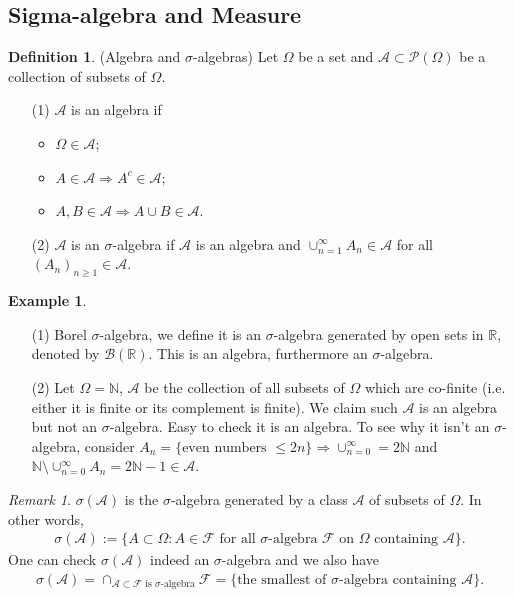\documentclass[a4paper,11pt]{report}
\theoremstyle{plain} %
\theoremstyle{definition} %
\newtheorem{defn}[thm]{Definition}
\newtheorem{eg}[thm]{Example}
\theoremstyle{remark} %
\newtheorem*{rem}{Remark}
\begin{document}
\subsection{Sigma-algebra and Measure}
\begin{defn}(Algebra and $\sigma$-algebras) Let $\Omega$ be a set and $\mathcal{A}\subset \mathcal{P}(\Omega)$ be a collection of subsets of $\Omega$. 
\begin{itemize}
    \item[(1)] $\mathcal{A}$ is an algebra if 
            \begin{itemize}
            \item     $\Omega \in \mathcal{A}$;  
            \item    $A\in \mathcal{A} \Rightarrow A^c \in \mathcal{A}$; 
            \item  $A,B \in \mathcal{A} \Rightarrow A \cup B \in \mathcal{A}$.
            \end{itemize}

    \item[(2)] $\mathcal{A}$ is an $\sigma$-algebra if $\mathcal{A}$ is an algebra and $\cup_{n=1}^{\infty} A_{n} \in \mathcal{A}$ for all $(A_{n})_{n\geq 1} \in \mathcal{A}$.
\end{itemize}

\end{defn}

\begin{eg}
\begin{itemize}
    \item[(1)] Borel $\sigma$-algebra, we define it is an $\sigma$-algebra generated by open sets in $\mathbb{R}$, denoted by $\mathcal{B}(\mathbb{R})$. This is an algebra, furthermore an $\sigma$-algebra.
    \item[(2)] Let $\Omega = \mathbb{N}$, $\mathcal{A}$ be the collection of all subsets of $\Omega$ which are co-finite (i.e. either it is finite or its complement is finite). We claim such $\mathcal{A}$ is an algebra but not an $\sigma$-algebra. Easy to check it is an algebra. To see why it isn't an $\sigma$-algebra, consider $A_{n}=\{\text{even numbers $\leq 2n$} \}\Rightarrow \cup_{n=0}^{\infty} = 2\mathbb{N} $ and $\mathbb{N}\setminus \cup_{n=0}^{\infty} A_{n}=2\mathbb{N}-1 \in \mathcal{A}$. 
\end{itemize}
\end{eg}

\begin{rem}$\sigma (\mathcal{A})$ is the $\sigma$-algebra generated by a class $\mathcal{A}$ of subsets of $\Omega$. In other words, 
\begin{align*}
    \sigma (\mathcal{A}):=\{A\subset \Omega: A\in \mathcal{F} \text{ for all $\sigma$-algebra $\mathcal{F}$ on $\Omega$ containing $\mathcal{A}$} \}.
\end{align*}
One can check $\sigma (\mathcal{A})$ indeed an $\sigma$-algebra and we also have 
\begin{align*}
    \sigma (\mathcal{A})= \cap _{\mathcal{A} \subset \mathcal{F} \text{ is $\sigma$-algebra} } \mathcal{F} = \{\text{the smallest of $\sigma$-algebra containing $\mathcal{A}$} \}.
\end{align*}
\end{rem}
\end{document}
